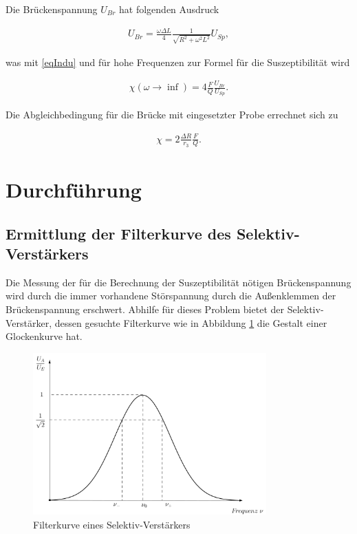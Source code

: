 Die Brückenspannung $U_{Br}$ hat folgenden Ausdruck

\begin{align}
 U_{Br} = \frac{\omega \Delta L}{4} \frac{1}{\sqrt{R^2+\omega^2L^2}} U_{Sp},
\end{align}

was mit \eqref{eqIndu} und für hohe Frequenzen zur Formel für die Suszeptibilität wird

\begin{align}
 \chi(\omega \to \inf) = 4 \frac{F}{Q} \frac{U_{Br}}{U_{Sp}}.
\end{align}

Die Abgleichbedingung für die Brücke mit eingesetzter Probe errechnet sich zu 

\begin{align}
 \chi = 2 \frac{\Delta R}{r_3} \frac{F}{Q}.
\end{align}

\section{Durchführung}
\subsection{Ermittlung der Filterkurve des Selektiv-Verstärkers}
Die Messung der für die Berechnung der Suszeptibilität nötigen Brückenspannung wird durch die immer vorhandene Störspannung durch
die Außenklemmen der Brückenspannung erschwert. Abhilfe für dieses Problem bietet der Selektiv-Verstärker, dessen gesuchte Filterkurve
wie in Abbildung \ref{picfilter} die Gestalt einer Glockenkurve hat. 

\begin{figure}[H]
 \includegraphics[width=0.8\textwidth]{pics/filterkurve.png}
 \caption{Filterkurve eines Selektiv-Verstärkers}
 \label{picfilter}
\end{figure}

